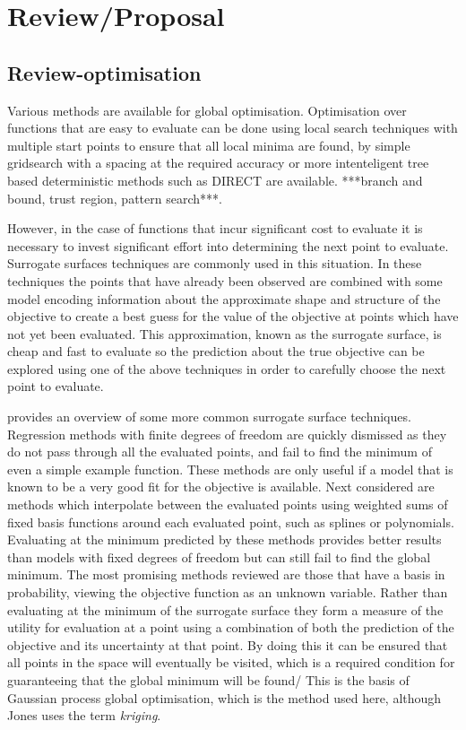 \documentclass[a4paper, 10 pt, conference]{ieeeconf}  %
\begin{document}
\section{Review/Proposal}
\doublespacing
\subsection{Review-optimisation}
\label{reviewoptimisation}
Various methods are available for global optimisation. Optimisation over functions that are easy to evaluate can be done using local search techniques with multiple start points to ensure that all local minima are found, by simple gridsearch with a spacing at the required accuracy or more intenteligent tree based deterministic methods such as DIRECT are available. ***branch and bound, trust region, pattern search***.

However, in the case of functions that incur significant cost to evaluate it is necessary to invest significant effort into determining the next point to evaluate. Surrogate surfaces techniques are commonly used in this situation. In these techniques the points that have already been observed are combined with some model encoding information about the approximate shape and structure of the objective to create a best guess for the value of the objective at points which have not yet been evaluated. This approximation, known as the surrogate surface, is cheap and fast to evaluate so the prediction about the true objective can be explored using one of the above techniques in order to carefully choose the next point to evaluate.

\cite{jones2001taxonomy} provides an overview of some more common surrogate surface techniques. Regression methods with finite degrees of freedom are quickly dismissed as they do not pass through all the evaluated points, and fail to find the minimum of even a simple example function. These methods are only useful if a model that is known to be a very good fit for the objective is available. Next considered are methods which interpolate between the evaluated points using weighted sums of fixed basis functions around each evaluated point, such as splines or polynomials. Evaluating at the minimum predicted by these methods provides better results than models with fixed degrees of freedom but can still fail to find the global minimum. The most promising methods reviewed are those that have a basis in probability, viewing the objective function as an unknown variable. Rather than evaluating at the minimum of the surrogate surface they form a measure of the utility for evaluation at a point using a combination of both the prediction of the objective and its uncertainty at that point. By doing this it can be ensured that all points in the space will eventually be visited, which is a required condition for guaranteeing that the global minimum will be found/ This is the basis of Gaussian process global optimisation, which is the method used here, although Jones uses the term \emph{kriging}.
\end{document}

